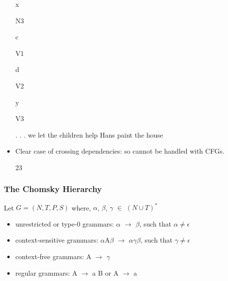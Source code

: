 \documentclass[compress,color=usenames]{beamer}
\begin{document}
\begin{frame}
\begin{itemize}
x


N3





c


V1





d


V2





y


V3





. . . we let the children help Hans paint the house





\item Clear case of crossing dependencies: so cannot be handled with CFGs.


23




\end{itemize}

\end{frame}

\begin{frame}
\frametitle{The Chomsky Hierarchy}

Let $G = (N, T, P, S )$ where, $\alpha$, $\beta$, $\gamma$ $\in$ $(N \cup T)^*$

\begin{itemize}
\item unrestricted or type-0 grammars: $\alpha$ $\rightarrow$ $\beta$, such that $\alpha \not = \epsilon$

\item context-sensitive grammars: $\alpha$A$\beta$ $\rightarrow$ $\alpha$$\gamma$$\beta$, such that $\gamma \not = \epsilon$

\item context-free grammars: A $\rightarrow$ $\gamma$

\item regular grammars: A $\rightarrow$ a B or A $\rightarrow$ a

\end{itemize}

\end{frame}
\end{document}
